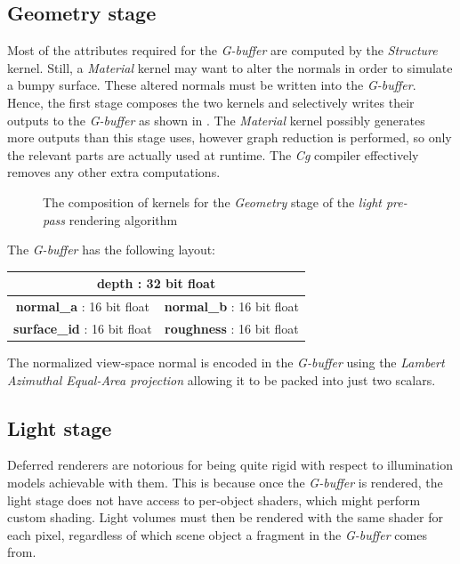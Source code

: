 \subsection{Geometry stage}

Most of the attributes required for the \emph{G-buffer} are computed by the \emph{Structure} kernel. Still, a \emph{Material} kernel may want to alter the normals in order to simulate a bumpy surface. These altered normals must be written into the \emph{G-buffer}. Hence, the first stage composes the two kernels and selectively writes their outputs to the \emph{G-buffer} as shown in . The \emph{Material} kernel possibly generates more outputs than this stage uses, however graph reduction is performed, so only the relevant parts are actually used at runtime. The \emph{Cg} compiler effectively removes any other extra computations.

\begin{figure}[ht!]
  \centering
    \caption[Light Pre-Pass Stage 1]{The composition of kernels for the \emph{Geometry} stage of the  \emph{light pre-pass} rendering algorithm}
  \label{fig:DeferredLightingStage1}
\end{figure}

The \emph{G-buffer} has the following layout:

\begin{center}
\begin{tabular}{ | c | c | }
\hline
\multicolumn{2}{|c|}{ \textbf{depth} : 32 bit float } \\
\hline
\textbf{normal\_a} : 16 bit float & \textbf{normal\_b} : 16 bit float \\
\hline
\textbf{surface\_id} : 16 bit float & \textbf{roughness} : 16 bit float \\
\hline
\end{tabular}
\end{center}

The normalized view-space normal is encoded in the \emph{G-buffer} using the \emph{Lambert Azimuthal Equal-Area projection} \cite{ArasNormalStorage} allowing it to be packed into just two scalars.

\subsection{Light stage}

Deferred renderers are notorious for being quite rigid with respect to illumination models achievable with them. This is because once the \emph{G-buffer} is rendered, the light stage does not have access to per-object shaders, which might perform custom shading. Light volumes must then be rendered with the same shader for each pixel, regardless of which scene object a fragment in the \emph{G-buffer} comes from.

